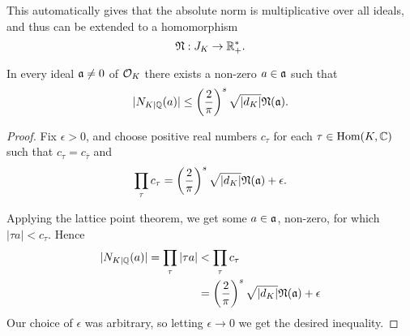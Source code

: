 This automatically gives that the absolute norm is multiplicative over all ideals, and thus can be extended to a homomorphism
\[
	\mathfrak{N} : J_K \to \mathbb{R}^*_+.
\]

\begin{lem}[Neukirch 6.2]
	In every ideal $\mathfrak{a}\neq 0$ of $\mathcal{O}_K$ there exists a non-zero $a\in\mathfrak{a}$ such that
	\[
		|N_{K\mid\mathbb{Q}}(a)| \leq \left(\frac{2}{\pi}\right)^s\sqrt{|d_K|}\mathfrak{N}(\mathfrak{a}).
	\]
\end{lem}
\begin{proof}
	Fix $\epsilon>0$, and choose positive real numbers $c_\tau$ for each $\tau\in\text{Hom}(K,\mathbb{C})$ such that $c_\tau = c_{\overline{\tau}}$ and
	\[
		\prod_\tau c_\tau = \left(\frac{2}{\pi}\right)^s\sqrt{|d_K|}\mathfrak{N}(\mathfrak{a})+ \epsilon.
	\]

	Applying the lattice point theorem, we get some $a\in\mathfrak{a}$, non-zero, for which $|\tau a|<c_\tau$. Hence
	\begin{align*}
		|N_{K\mid\mathbb{Q}}(a)| = \prod_\tau |\tau a| &< \prod_\tau c_\tau\\
			&= \left(\frac{2}{\pi}\right)^s\sqrt{|d_K|}\mathfrak{N}(\mathfrak{a})+ \epsilon
	\end{align*}
	Our choice of $\epsilon$ was arbitrary, so letting $\epsilon\to 0$ we get the desired inequality.
\end{proof}


